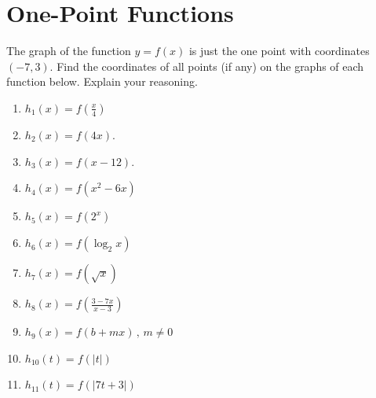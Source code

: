\documentclass{ximera}
\begin{document}
\section{One-Point Functions}

\begin{question} \label{QMfmdf33}
The graph of the function $y=f(x)$ is just the one point  with coordinates $(-7,3)$. Find the coordinates of all points (if any) on the graphs of each function below. Explain your reasoning.

\begin{enumerate}
\item $h_1(x) = f \left( \frac{x}{4} \right)$

\item $h_2(x) = f(4x)$.

\item $h_3(x) = f(x-12)$.

\item $h_4(x) = f(x^2 - 6x)$

\item $h_5(x) = f(2^x)$

\item $h_6(x) = f(\log_2 x)$

\item $h_7(x) = f(\sqrt{x})$

\item $h_8(x) = f \left( \frac{3-7x}{x-3} \right)$

\item $h_9(x) = f(b + mx) \, , \, m\neq 0$

\item $h_{10}(t) = f\left( \left| t  \right| \right)$

\item $h_{11}(t) = f\left( \left|7 t +3 \right| \right)$
\end{enumerate}

\end{question}
\end{document}

